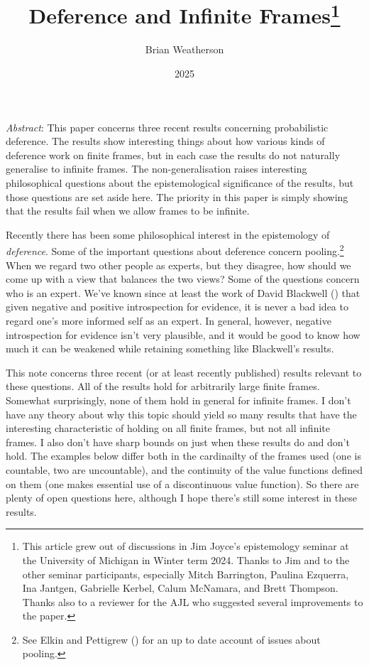 \documentclass[
  11pt,
  letterpaper,
  DIV=11,
  numbers=noendperiod,
  twoside]{scrartcl}
\title{Deference and Infinite Frames\thanks{This article grew out of
discussions in Jim Joyce's epistemology seminar at the University of
Michigan in Winter term 2024. Thanks to Jim and to the other seminar
participants, especially Mitch Barrington, Paulina Ezquerra, Ina
Jantgen, Gabrielle Kerbel, Calum McNamara, and Brett Thompson. Thanks
also to a reviewer for the AJL who suggested several improvements to the
paper.}}
\author{Brian Weatherson}
\date{2025}
\renewenvironment{abstract}
 {\vspace{-1.25cm}
 \quotation\small\noindent\emph{Abstract}:}
 {\endquotation}
\renewenvironment{abstract}
 {\quotation\small\noindent\emph{Abstract}:}
 {\endquotation\vspace{-0.02cm}}
\begin{document}
\maketitle
\begin{abstract}
This paper concerns three recent results concerning probabilistic
deference. The results show interesting things about how various kinds
of deference work on finite frames, but in each case the results do not
naturally generalise to infinite frames. The non-generalisation raises
interesting philosophical questions about the epistemological
significance of the results, but those questions are set aside here. The
priority in this paper is simply showing that the results fail when we
allow frames to be infinite.
\end{abstract}


Recently there has been some philosophical interest in the epistemology
of \emph{deference}. Some of the important questions about deference
concern pooling.\footnote{See Elkin and Pettigrew
  () for an up to date account of
  issues about pooling.} When we regard two other people as experts, but
they disagree, how should we come up with a view that balances the two
views? Some of the questions concern who is an expert. We've known since
at least the work of David Blackwell
() that given negative and positive
introspection for evidence, it is never a bad idea to regard one's more
informed self as an expert. In general, however, negative introspection
for evidence isn't very plausible, and it would be good to know how much
it can be weakened while retaining something like Blackwell's results.

This note concerns three recent (or at least recently published) results
relevant to these questions. All of the results hold for arbitrarily
large finite frames. Somewhat surprisingly, none of them hold in general
for infinite frames. I don't have any theory about why this topic should
yield so many results that have the interesting characteristic of
holding on all finite frames, but not all infinite frames. I also don't
have sharp bounds on just when these results do and don't hold. The
examples below differ both in the cardinailty of the frames used (one is
countable, two are uncountable), and the continuity of the value
functions defined on them (one makes essential use of a discontinuous
value function). So there are plenty of open questions here, although I
hope there's still some interest in these results.
\end{document}
